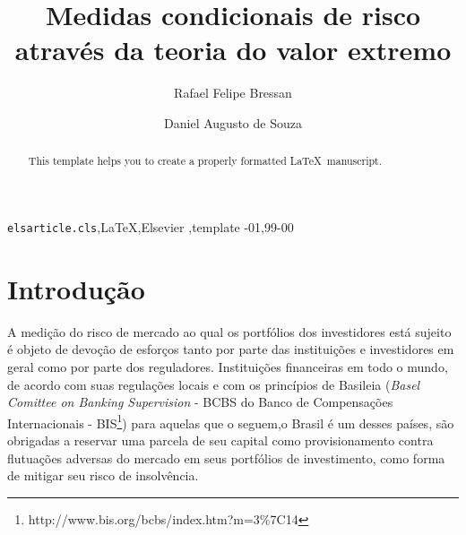 \documentclass[1p]{elsarticle}
\theoremstyle{definition}
\begin{document}
	
\listoftodos

\begin{frontmatter}

\title{Medidas condicionais de risco através da teoria do valor extremo}%



\author[mymainaddress]{Rafael Felipe Bressan}
%
\author[mymainaddress]{Daniel Augusto de Souza}

\address[mymainaddress]{Avenida Madre Benvenuta, 2007 - Santa Mônica Florianópolis - SC 88035-901}

\begin{abstract}
This template helps you to create a properly formatted \LaTeX\ manuscript.
\end{abstract}

\begin{keyword}
\texttt{elsarticle.cls}\sep \LaTeX\sep Elsevier \sep template
-01\sep  99-00
\end{keyword}

\end{frontmatter}

\linenumbers

\section{Introdução}

A medição do risco de mercado ao qual os portfólios dos investidores está sujeito é objeto de devoção de esforços tanto por parte das instituições e investidores em geral como por parte dos reguladores. Instituições financeiras em todo o mundo, de acordo com suas regulações locais e com os princípios de Basileia (\emph{Basel Comittee on Banking Supervision} - BCBS do Banco de Compensações Internacionais - BIS\footnote{http://www.bis.org/bcbs/index.htm?m=3\%7C14}) para aquelas que o seguem,o Brasil é um desses países, são obrigadas a reservar uma parcela de seu capital como provisionamento contra flutuações adversas do mercado em seus portfólios de investimento, como forma de mitigar seu risco de insolvência.
\end{document}
